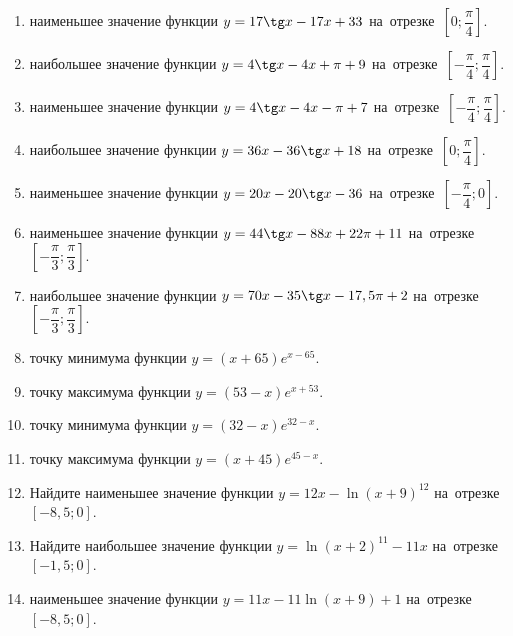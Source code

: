 \documentclass[a4paper,10pt]{article}
\begin{document}
\begin{enumerate}
\item {} наименьшее значение функции $y = 17\tg x-17x+33$ на~отрезке~$\left[0;\dfrac{\pi }{4}\right]$.

\item {} наибольшее значение функции $y=4\tg x-4x+\pi +9$ на~отрезке~$\left[-\dfrac{\pi }{4};\dfrac{\pi }{4}\right]$.

\item {} наименьшее значение функции $y=4\tg x-4x-\pi +7$ на~отрезке~$\left[-\dfrac{\pi }{4};\dfrac{\pi }{4}\right]$.

\item {} наибольшее значение функции $y = 36x-36\tg x +18$ на~отрезке~$\left[0;\dfrac{\pi }{4}\right]$.

\item {} наименьшее значение функции $y = 20x-20\tg x -36$ на~отрезке~$\left[-\dfrac{\pi }{4};0\right]$.

\item {} наименьшее значение функции $y = 44\tg x-88x+22 \pi +11$ на~отрезке~$\left[-\dfrac{\pi }{3};\dfrac{\pi }{3}\right]$.

\item {} наибольшее значение функции $y = 70x-35\tg x-17,5\pi +2$ на~отрезке~$\left[-\dfrac{\pi }{3};\dfrac{\pi }{3}\right]$.

\item {} точку минимума функции $y = \left(x+65\right)e^{x-65}$.

\item {} точку максимума функции $y = \left(53-x\right)e^{x+53}$.

\item {} точку минимума функции $y = \left(32-x\right)e^{32-x}$.

\item {} точку максимума функции $y = \left(x+45\right)e^{45-x}$.

\item Найдите наименьшее значение функции $y = 12x-\ln \left(x+9\right)^{12}$ на~отрезке~$\left[-8,5;0\right]$.

\item Найдите наибольшее значение функции $y = \ln \left(x+2\right)^{11}-11x$ на~отрезке~$\left[-1,5;0\right]$.

\item {} наименьшее значение функции $y = 11x-11\ln \left(x+9\right) +1$ на~отрезке~$\left[-8,5;0\right]$.


\end{enumerate}
\end{document}
